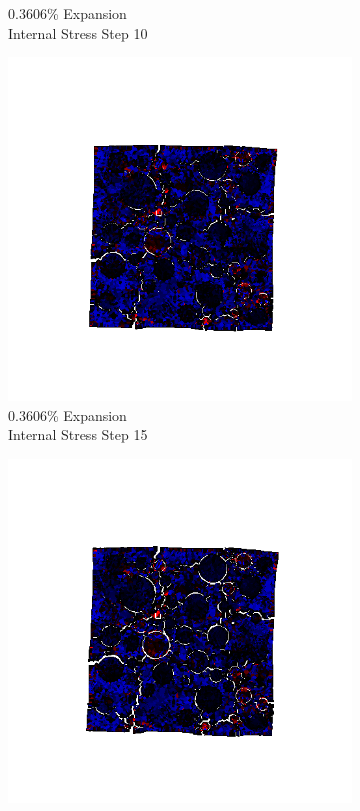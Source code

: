 \begin{figure}[ht!]
\begin{subfigure}{.25\textwidth}
      \caption{0.3606\% Expansion\\Internal Stress Step 10}
    \end{subfigure}%
    \begin{subfigure}{.25\textwidth}
      \centering
      \includegraphics[width=1.0\linewidth]{Files/exp_3D/ASR/A30P25_2_s15.png}
      \caption{0.3606\% Expansion\\Internal Stress Step 15}
    \end{subfigure}%
    \begin{subfigure}{.25\textwidth}
      \centering
      \includegraphics[width=1.0\linewidth]{Files/exp_3D/ASR/A30P25_2_stress.png}

\end{subfigure}
\end{figure}
